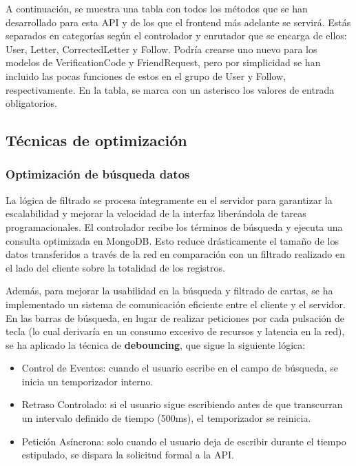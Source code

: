 A continuación, se muestra una tabla con todos los métodos que se han desarrollado para esta API y de los que el frontend más adelante se servirá. Estás separados en categorías según el controlador y enrutador que se encarga de ellos: User, Letter, CorrectedLetter y Follow. Podría crearse uno nuevo para los modelos de VerificationCode y FriendRequest, pero por simplicidad se han incluido las pocas funciones de estos en el grupo de User y Follow, respectivamente. En la tabla, se marca con un asterisco los valores de entrada obligatorios.




\subsection{Técnicas de optimización}

\subsubsection{Optimización de búsqueda datos}
La lógica de filtrado se procesa íntegramente en el servidor para garantizar la escalabilidad y mejorar la velocidad de la interfaz liberándola de tareas programacionales. El controlador recibe los términos de búsqueda y ejecuta una consulta optimizada en MongoDB. Esto reduce drásticamente el tamaño de los datos transferidos a través de la red en comparación con un filtrado realizado en el lado del cliente sobre la totalidad de los registros.

Además, para mejorar la usabilidad en la búsqueda y filtrado de cartas, se ha implementado un sistema de comunicación eficiente entre el cliente y el servidor. En las barras de búsqueda, en lugar de realizar peticiones por cada pulsación de tecla (lo cual derivaría en un consumo excesivo de recursos y latencia en la red), se ha aplicado la técnica de \textbf{debouncing}, que sigue la siguiente lógica:

\begin{itemize}
    \item Control de Eventos: cuando el usuario escribe en el campo de búsqueda, se inicia un temporizador interno.
    \item Retraso Controlado: si el usuario sigue escribiendo antes de que transcurran un intervalo definido de tiempo (500ms), el temporizador se reinicia.
    \item Petición Asíncrona: solo cuando el usuario deja de escribir durante el tiempo estipulado, se dispara la solicitud formal a la API.
\end{itemize}

